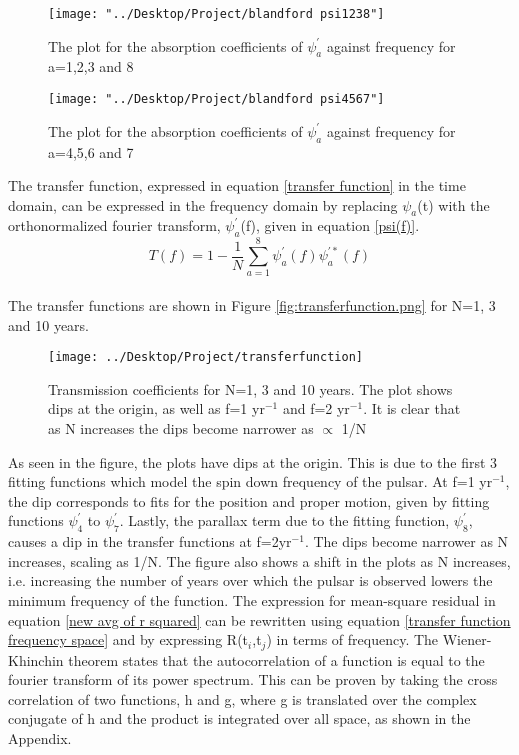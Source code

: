 \documentclass[12pt]{article}
\begin{document}
\begin{figure}[th!]
	\texttt{[image: "../Desktop/Project/blandford psi1238"]}
	\caption{\label{fig:blandford_psi1238.png} The plot for the absorption coefficients of $\psi_a^{'}$ against frequency for a=1,2,3 and 8}
	\label{fig:blandford-psi1238}
\end{figure}
\begin{figure}[th!]
	\texttt{[image: "../Desktop/Project/blandford psi4567"]}
	\caption{\label{fig:blandford_psi4567.png} The plot for the absorption coefficients of $\psi_a^{'}$ against frequency for a=4,5,6 and 7}
	\label{fig:blandford-psi4567}
\end{figure}
	The transfer function, expressed in equation \ref{transfer function} in the time domain, can be expressed in the frequency domain by replacing $\psi_a$(t) with the orthonormalized fourier transform, $\psi_a^{'}$(f), given in equation \ref{psi(f)}.\\
	\begin{equation}\label{transfer function frequency space}
	T(f)=1-\frac{1}{N}\sum_{a=1}^{8}\psi_a^{'}(f)\psi_a^{'*}(f)
	\end{equation}\\
	The transfer functions are shown in Figure \ref{fig:transferfunction.png} for N=1, 3 and 10 years. 
\begin{figure}[th!]
	\texttt{[image: ../Desktop/Project/transferfunction]}
	\caption{\label{fig:transferfunction}Transmission coefficients for N=1, 3 and 10 years. The plot shows dips at the origin, as well as f=1 yr$^{-1}$ and f=2 yr$^{-1}$. It is clear that as N increases the dips become narrower as $\propto$ 1/N}
\end{figure}
	As seen in the figure, the plots have dips at the origin. This is due to the first 3 fitting functions which model the spin down frequency of the pulsar. At f=1 yr$^{-1}$, the dip corresponds to fits for the position and proper motion, given by fitting functions $\psi_4^{'}$ to $\psi_7^{'}$. Lastly, the parallax term due to the fitting function, $\psi_8^{'}$, causes a dip in the transfer functions at f=2yr$^{-1}$. The dips become narrower as N increases, scaling as 1/N. The figure also shows a shift in the plots as N increases, i.e. increasing the number of years over which the pulsar is observed lowers the minimum frequency of the function.
	The expression for mean-square residual in equation \ref{new avg of r squared} can be rewritten using equation \ref{transfer function frequency space} and by expressing R(t$_i$,t$_j$) in terms of frequency. The Wiener-Khinchin theorem states that the autocorrelation of a function is equal to the fourier transform of its power spectrum. This can be proven by taking the cross correlation of two functions, h and g, where g is translated over the complex conjugate of h and the product is integrated over all space, as shown in the Appendix.\\ 
\end{document}
